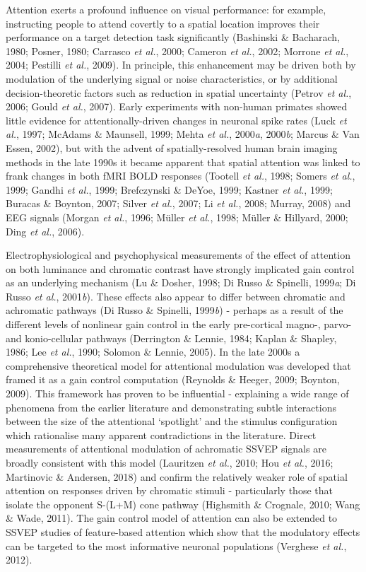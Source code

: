 \documentclass[
  letterpaper,
  DIV=11,
  numbers=noendperiod]{scrartcl}
\begin{document}
Attention exerts a profound influence on visual performance: for
example, instructing people to attend covertly to a spatial location
improves their performance on a target detection task significantly
(Bashinski \& Bacharach, 1980; Posner, 1980; Carrasco \emph{et al.},
2000; Cameron \emph{et al.}, 2002; Morrone \emph{et al.}, 2004; Pestilli
\emph{et al.}, 2009). In principle, this enhancement may be driven both
by modulation of the underlying signal or noise characteristics, or by
additional decision-theoretic factors such as reduction in spatial
uncertainty (Petrov \emph{et al.}, 2006; Gould \emph{et al.}, 2007).
Early experiments with non-human primates showed little evidence for
attentionally-driven changes in neuronal spike rates (Luck \emph{et
al.}, 1997; McAdams \& Maunsell, 1999; Mehta \emph{et al.},
2000\emph{a}, 2000\emph{b}; Marcus \& Van Essen, 2002), but with the
advent of spatially-resolved human brain imaging methods in the late
1990s it became apparent that spatial attention was linked to frank
changes in both fMRI BOLD responses (Tootell \emph{et al.}, 1998; Somers
\emph{et al.}, 1999; Gandhi \emph{et al.}, 1999; Brefczynski \& DeYoe,
1999; Kastner \emph{et al.}, 1999; Buracas \& Boynton, 2007; Silver
\emph{et al.}, 2007; Li \emph{et al.}, 2008; Murray, 2008) and EEG
signals (Morgan \emph{et al.}, 1996; Müller \emph{et al.}, 1998; Müller
\& Hillyard, 2000; Ding \emph{et al.}, 2006).

Electrophysiological and psychophysical measurements of the effect of
attention on both luminance and chromatic contrast have strongly
implicated gain control as an underlying mechanism (Lu \& Dosher, 1998;
Di Russo \& Spinelli, 1999\emph{a}; Di Russo \emph{et al.},
2001\emph{b}). These effects also appear to differ between chromatic and
achromatic pathways (Di Russo \& Spinelli, 1999\emph{b}) - perhaps as a
result of the different levels of nonlinear gain control in the early
pre-cortical magno-, parvo- and konio-cellular pathways (Derrington \&
Lennie, 1984; Kaplan \& Shapley, 1986; Lee \emph{et al.}, 1990; Solomon
\& Lennie, 2005). In the late 2000s a comprehensive theoretical model
for attentional modulation was developed that framed it as a gain
control computation (Reynolds \& Heeger, 2009; Boynton, 2009). This
framework has proven to be influential - explaining a wide range of
phenomena from the earlier literature and demonstrating subtle
interactions between the size of the attentional `spotlight' and the
stimulus configuration which rationalise many apparent contradictions in
the literature. Direct measurements of attentional modulation of
achromatic SSVEP signals are broadly consistent with this model
(Lauritzen \emph{et al.}, 2010; Hou \emph{et al.}, 2016; Martinovic \&
Andersen, 2018) and confirm the relatively weaker role of spatial
attention on responses driven by chromatic stimuli - particularly those
that isolate the opponent S-(L+M) cone pathway (Highsmith \& Crognale,
2010; Wang \& Wade, 2011). The gain control model of attention can also
be extended to SSVEP studies of feature-based attention which show that
the modulatory effects can be targeted to the most informative neuronal
populations (Verghese \emph{et al.}, 2012).
\end{document}
